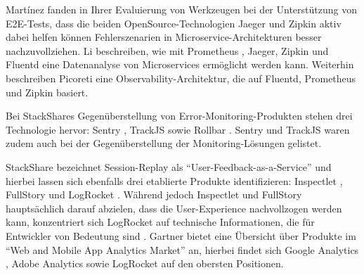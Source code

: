 
Mart{\'i}nez \etal \cite{ComparisonOfE2ETestingToolsForMicroservices} fanden in Ihrer Evaluierung von Werkzeugen bei der Unterstützung von E2E-Tests, dass die beiden OpenSource-Technologien Jaeger \cite{Jaeger} und Zipkin \cite{Zipkin} aktiv dabei helfen können Fehlerszenarien in Microservice-Architekturen besser nachzuvollziehen. Li \etal \cite{ServiceMeshChallengesStateOfTheArt} beschreiben, wie mit Prometheus \cite{Prometheus}, Jaeger, Zipkin und Fluentd \cite{Fluentd} eine Datenanalyse von Microservices ermöglicht werden kann. Weiterhin beschreiben Picoreti \etal \cite{MultilevelObservabilityInCloudOrchestration} eine Observability-Architektur, die auf Fluentd, Prometheus und Zipkin basiert.

Bei StackShares Gegenüberstellung von Error-Monitoring-Produkten \cite{StackShareExceptionMonitoring} stehen drei Technologie hervor: Sentry \cite{Sentry}, TrackJS \cite{TrackJS} sowie Rollbar \cite{Rollbar}. Sentry und TrackJS waren zudem auch bei der Gegenüberstellung der Monitoring-Lösungen \cite{StackShareMonitoring} gelistet.

StackShare bezeichnet Session-Replay als \enquote{User-Feedback-as-a-Service} und hierbei \cite{StackShareUserFeedbackAsAService} lassen sich ebenfalls drei etablierte Produkte identifizieren: Inspectlet \cite{Inspectlet}, FullStory \cite{FullStory} und LogRocket \cite{LogRocket}. Während jedoch Inspectlet und FullStory hauptsächlich darauf abzielen, dass die User-Experience nachvollzogen werden kann, konzentriert sich LogRocket auf technische Informationen, die für Entwickler von Bedeutung sind \cite{Webalyt}. Gartner bietet eine Übersicht \cite{GartnerWebAndMobileAppAnalytics} über Produkte im \enquote{Web and Mobile App Analytics Market} an, hierbei findet sich Google Analytics \cite{GoogleAnalytics}, Adobe Analytics \cite{AdobeAnalytics} sowie LogRocket auf den obersten Positionen.

